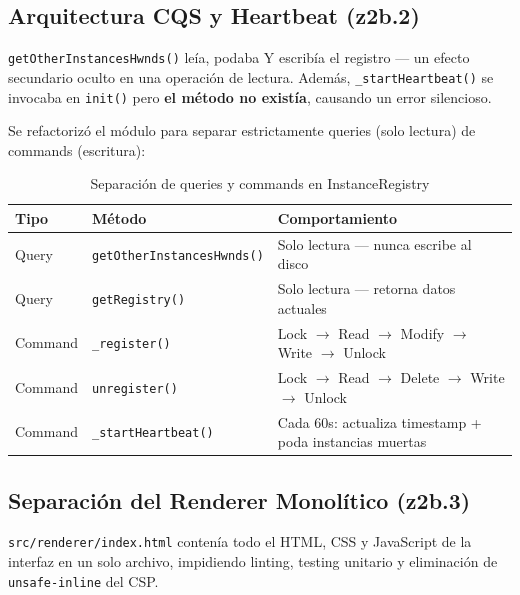 \documentclass[12pt,a4paper]{article}
\begin{document}
\subsection{Arquitectura CQS y Heartbeat (z2b.2)}

\begin{findingbox}
\texttt{getOtherInstancesHwnds()} le\'ia, podaba Y escrib\'ia el registro --- un efecto secundario oculto en una operaci\'on de lectura. Adem\'as, \texttt{\_startHeartbeat()} se invocaba en \texttt{init()} pero \textbf{el m\'etodo no exist\'ia}, causando un error silencioso.
\end{findingbox}

\begin{fixbox}
Se refactoriz\'o el m\'odulo para separar estrictamente queries (solo lectura) de commands (escritura):
\end{fixbox}

\begin{table}[H]
\centering
\renewcommand{\arraystretch}{1.3}
\begin{tabularx}{\textwidth}{l l X}
\toprule
\textbf{Tipo} & \textbf{M\'etodo} & \textbf{Comportamiento} \\
\midrule
Query & \texttt{getOtherInstancesHwnds()} & Solo lectura --- nunca escribe al disco \\
Query & \texttt{getRegistry()} & Solo lectura --- retorna datos actuales \\
Command & \texttt{\_register()} & Lock $\rightarrow$ Read $\rightarrow$ Modify $\rightarrow$ Write $\rightarrow$ Unlock \\
Command & \texttt{unregister()} & Lock $\rightarrow$ Read $\rightarrow$ Delete $\rightarrow$ Write $\rightarrow$ Unlock \\
Command & \texttt{\_startHeartbeat()} & Cada 60s: actualiza timestamp + poda instancias muertas \\
\bottomrule
\end{tabularx}
\caption{Separaci\'on de queries y commands en InstanceRegistry}
\end{table}

\subsection{Separaci\'on del Renderer Monol\'itico (z2b.3)}

\begin{findingbox}
\texttt{src/renderer/index.html} conten\'ia todo el HTML, CSS y JavaScript de la interfaz en un solo archivo, impidiendo linting, testing unitario y eliminaci\'on de \texttt{unsafe-inline} del CSP.
\end{findingbox}
\end{document}
